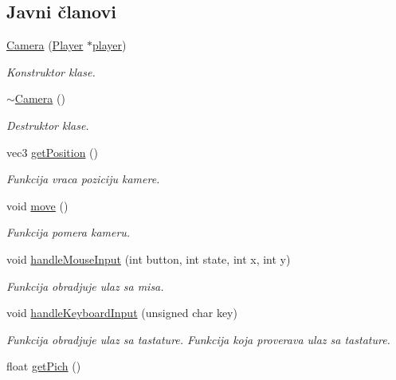 \subsection*{Javni članovi}
\begin{DoxyCompactItemize}
\item 
\hyperlink{classentity_1_1Camera_ae28b5312d87e147f8a6a6b3f76c1d0fa}{Camera} (\hyperlink{classentity_1_1Player}{Player} $\ast$\hyperlink{classentity_1_1Camera_ace429069cf20c1138038c00b10e2c608}{player})
\begin{DoxyCompactList}\small\item\em Konstruktor klase. \end{DoxyCompactList}\item 
\hyperlink{classentity_1_1Camera_ae161d83061be4f328de222570c3ece95}{$\sim$\+Camera} ()
\begin{DoxyCompactList}\small\item\em Destruktor klase. \end{DoxyCompactList}\item 
vec3 \hyperlink{classentity_1_1Camera_a2c6b67d27b4012631306c2c2c5a3691c}{get\+Position} ()
\begin{DoxyCompactList}\small\item\em Funkcija vraca poziciju kamere. \end{DoxyCompactList}\item 
void \hyperlink{classentity_1_1Camera_a046d693a76fafe58822033c0b80bbc53}{move} ()
\begin{DoxyCompactList}\small\item\em Funkcija pomera kameru. \end{DoxyCompactList}\item 
void \hyperlink{classentity_1_1Camera_aa9a3b78671fb7385198696733b4faca4}{handle\+Mouse\+Input} (int button, int state, int x, int y)
\begin{DoxyCompactList}\small\item\em Funkcija obradjuje ulaz sa misa. \end{DoxyCompactList}\item 
void \hyperlink{classentity_1_1Camera_a04352a62ec2c4031cfde35192faf6e03}{handle\+Keyboard\+Input} (unsigned char key)
\begin{DoxyCompactList}\small\item\em Funkcija obradjuje ulaz sa tastature. Funkcija koja proverava ulaz sa tastature. \end{DoxyCompactList}\item 
float \hyperlink{classentity_1_1Camera_a502da7b4da0782356f7bf75e99e4419c}{get\+Pich} ()

\end{DoxyCompactItemize}
